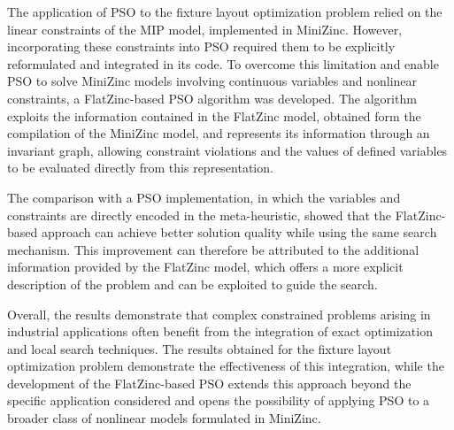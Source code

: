 The application of PSO to the fixture layout optimization problem relied on the linear constraints of the MIP model, implemented in MiniZinc. However, incorporating these constraints into PSO required them to be explicitly reformulated and integrated in its code. To overcome this limitation and enable PSO to solve MiniZinc models involving continuous variables and nonlinear constraints, a FlatZinc-based PSO algorithm was developed. The algorithm exploits the information contained in the FlatZinc model, obtained form the compilation of the MiniZinc model, and represents its information through an invariant graph, allowing constraint violations and the values of defined variables to be evaluated directly from this representation.

The comparison with a PSO implementation, in which the variables and constraints are directly encoded in the meta-heuristic, showed that the FlatZinc-based approach can achieve better solution quality while using the same search mechanism. This improvement can therefore be attributed to the additional information provided by the FlatZinc model, which offers a more explicit description of the problem and can be exploited to guide the search.

Overall, the results demonstrate that complex constrained problems arising in industrial applications often benefit from the integration of exact optimization and local search techniques. The results obtained for the fixture layout optimization problem demonstrate the effectiveness of this integration, while the development of the FlatZinc-based PSO extends this approach beyond the specific application considered and opens the possibility of applying PSO to a broader class of nonlinear models formulated in MiniZinc.


